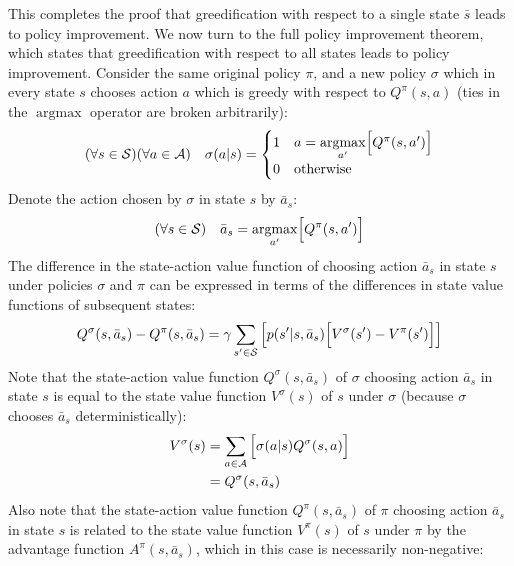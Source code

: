 This completes the proof that greedification with respect to a single state $\bar{s}$ leads to policy improvement. We now turn to the full policy improvement theorem, which states that greedification with respect to all states leads to policy improvement. Consider the same original policy $\pi$, and a new policy $\sigma$ which in every state $s$ chooses action $a$ which is greedy with respect to $Q^\pi(s, a)$ (ties in the $\operatorname{argmax}$ operator are broken arbitrarily):
\begin{equation*}
    (\forall s\in\mathcal{S})(\forall a\in\mathcal{A})\quad\sigma(a\vert s) = \begin{cases}
        1 & a = \underset{a'}{\operatorname{argmax}}\Bigl[ Q^\pi(s, a') \Bigr] \\
        0 & \text{otherwise}
    \end{cases}
\end{equation*}
Denote the action chosen by $\sigma$ in state $s$ by $\bar{a}_s$:
\begin{equation*}
    (\forall s\in\mathcal{S})\quad \bar{a}_s = \underset{a'}{\operatorname{argmax}}\Bigl[ Q^\pi(s, a') \Bigr]
\end{equation*}
The difference in the state-action value function of choosing action $\bar{a}_s$ in state $s$ under policies $\sigma$ and $\pi$ can be expressed in terms of the differences in state value functions of subsequent states:
\begin{equation*}
    Q^\sigma(s, \bar{a}_s) - Q^\pi(s, \bar{a}_s) = \gamma\sum_{s'\in\mathcal{S}}{\left[ p(s'\vert s, \bar{a}_s) \Bigl[ V^\sigma(s') - V^\pi(s')\Bigr] \right]}
\end{equation*}
Note that the state-action value function $Q^\sigma(s, \bar{a}_s)$ of $\sigma$ choosing action $\bar{a}_s$ in state $s$ is equal to the state value function $V^\sigma(s)$ of $s$ under $\sigma$ (because $\sigma$ chooses $\bar{a}_s$ deterministically):
\begin{align*}
    V^\sigma(s) &= \sum_{a\in\mathcal{A}}{\Bigl[ \sigma(a\vert s) Q^\sigma(s, a) \Bigr]} \\
    &= Q^\sigma(s, \bar{a}_s)
\end{align*}
Also note that the state-action value function $Q^\pi(s, \bar{a}_s)$ of $\pi$ choosing action $\bar{a}_s$ in state $s$ is related to the state value function $V^\pi(s)$ of $s$ under $\pi$ by the advantage function $A^\pi(s, \bar{a}_s)$, which in this case is necessarily non-negative:
